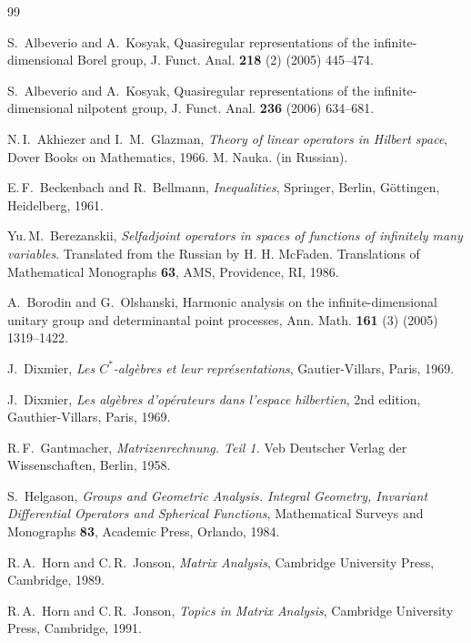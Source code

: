 \documentclass[preprint,12pt]{elsarticle}
\numberwithin{equation}{section}
\begin{document}
\begin{thebibliography}{99}

S.~Albeverio and A.~Kosyak, Quasiregular representations of the infinite-dimensional Borel group, J. Funct.
Anal. {\bf 218} (2) (2005) 445--474. 


 S.~Albeverio and A.~Kosyak, Quasiregular representations of the infinite-dimensional nilpotent
group,  J. Funct. Anal.  {\bf 236} (2006) 634--681. 


 N.\,I.~Akhiezer and 
I.\, M.~Glazman, {\it Theory of linear operators in Hilbert space}, Dover Books on Mathematics, 1966. M. Nauka. (in Russian).



 E.\,F.~Beckenbach and R.~Bellmann,  {\it Inequalities},
Springer, Berlin, G\"ottingen, Heidelberg, 1961. 


 Yu.\,M.~Berezanskii, {\it Selfadjoint operators
in spaces of functions of infinitely many variables}. Translated
from the Russian by H. H. McFaden. Translations of Mathematical
Monographs {\bf 63}, AMS, Providence, RI, 1986.


A.~Borodin and  G.~Olshanski,
Harmonic analysis on the infinite-dimensional unitary group and determinantal point processes, 
Ann. Math. {\bf 161} (3) (2005) 1319--1422.


 J.~Dixmier, {\it Les  $C^*$-alg\`ebres et leur
repr\'esentations}, Gautier-Villars, Paris, 1969.  




 J.~Dixmier,  {\it Les  alg\`ebres d'op\'erateurs dans
l'espace hilbertien}, 2nd edition, Gauthier-Villars, Paris, 1969. 


 R.\,F.~Gantmacher, {\it Matrizenrechnung. Teil 1.}
Veb Deutscher Verlag der Wissenschaften, Berlin, 1958. 




S.~Helgason, {\it Groups and Geometric Analysis. Integral Geometry, Invariant Differential Operators and Spherical Functions}, 
Mathematical Surveys and Monographs {\bf 83}, Academic Press, Orlando, 1984. 



 R.\,A.~Horn and C.\,R.~Jonson, {\it Matrix Analysis},
Cambridge University Press, Cambridge, 1989. 


%
 R.\,A.~Horn and C.\,R.~Jonson,  {\it Topics in Matrix Analysis},
Cambridge University Press, Cambridge, 1991. 




\end{thebibliography}
\end{document}
